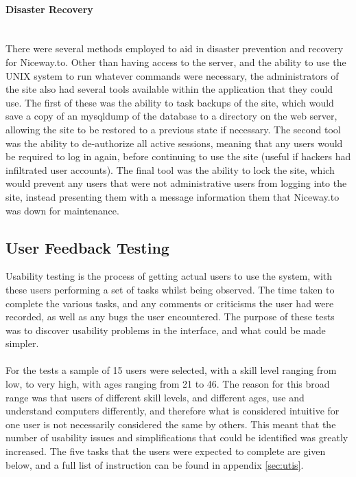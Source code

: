 \paragraph{Disaster Recovery}\ \\
There were several methods employed to aid in disaster prevention and recovery for Niceway.to. Other than having access to the server, and the ability to use the UNIX system to run whatever commands were necessary, the administrators of the site also had several tools available within the application that they could use. The first of these was the ability to task backups of the site, which would save a copy of an mysqldump of the database to a directory on the web server, allowing the site to be restored to a previous state if necessary. The second tool was the ability to de-authorize all active sessions, meaning that any users would be required to log in again, before continuing to use the site (useful if hackers had infiltrated user accounts). The final tool was the ability to lock the site, which would prevent any users that were not administrative users from logging into the site, instead presenting them with a message information them that Niceway.to was down for maintenance.

\newpage 
\subsection{User Feedback Testing}
\label{sec:rite}
Usability testing is the process of getting actual users to use the system, with these users performing a set of tasks whilst being observed. The time taken to complete the various tasks, and any comments or criticisms the user had were recorded, as well as any bugs the user encountered. The purpose of these tests was to discover usability problems in the interface, and what could be made simpler.\ \\
\ \\
For the tests a sample of 15 users were selected, with a skill level ranging from low, to very high, with ages ranging from 21 to 46. The reason for this broad range was that users of different skill levels, and different ages, use and understand computers differently, and therefore what is considered intuitive for one user is not necessarily considered the same by others. This meant that the number of usability issues and simplifications that could be identified was greatly increased. The five tasks that the users were expected to complete are given below, and a full list of instruction can be found in appendix \ref{sec:utis}.

